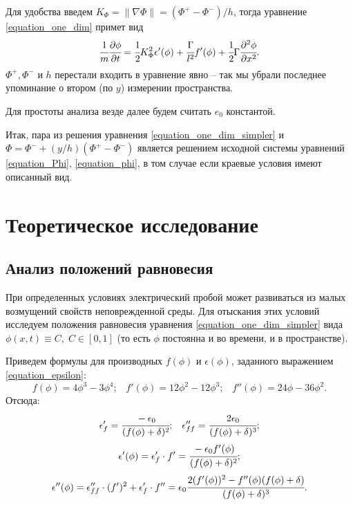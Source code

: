 \documentclass[a4paper,12pt]{article}
\theoremstyle{plain}
\theoremstyle{definition}
\begin{document}
Для удобства введем $K_\Phi = \|\nabla \Phi\| = (\Phi^+ - \Phi^-)/h$, тогда уравнение \eqref{equation_one_dim} примет вид
\begin{equation}
    \cfrac{1}{m} \cfrac{\partial \phi}{\partial t} = \cfrac{1}{2} K_\Phi^2 \epsilon'(\phi) + \cfrac{\Gamma}{l^2} f'(\phi) + \cfrac{1}{2} \Gamma \cfrac{\partial^2 \phi}{\partial x^2} \text{.}
    \label{equation_one_dim_simpler}
\end{equation}
$\Phi^+, \Phi^-$ и $h$ перестали входить в уравнение явно -- так мы убрали последнее упоминание о втором (по $y$) измерении пространства.

Для простоты анализа везде далее будем считать $e_0$ константой.

Итак, пара из решения уравнения \eqref{equation_one_dim_simpler} и $\Phi = \Phi^- + (y/h)(\Phi^+ - \Phi^-)$ является решением исходной системы уравнений \eqref{equation_Phi}, \eqref{equation_phi}, в том случае если краевые условия имеют описанный вид.


\section{Теоретическое исследование}
\label{section_theoretical_analysis}

\subsection{Анализ положений равновесия}

При определенных условиях электрический пробой может развиваться из малых возмущений свойств неповрежденной среды. Для отыскания этих условий исследуем положения равновесия уравнения \eqref{equation_one_dim_simpler} вида $\phi(x, t) \equiv C, \; C \in [0, 1]$ (то есть $\phi$ постоянна и во времени, и в пространстве).

Приведем формулы для производных $f(\phi)$ и $\epsilon(\phi)$, заданного выражением \eqref{equation_epsilon}:
$$f(\phi) = 4 \phi^3 - 3 \phi^4 \text{;} \quad f'(\phi) = 12 \phi^2 - 12 \phi^3 \text{;} \quad f''(\phi) = 24 \phi - 36 \phi^2 \text{.}$$
Отсюда:
$$\epsilon'_f = \cfrac{-\epsilon_0}{(f(\phi) + \delta)^2} \text{;} \quad \epsilon''_{ff} = \cfrac{2 \epsilon_0}{(f(\phi) + \delta)^3} \text{;}$$
\begin{equation}
    \epsilon'(\phi) = \epsilon'_f \cdot f' = \cfrac{-\epsilon_0 f'(\phi)}{(f(\phi) + \delta)^2} \text{;}
    \label{equation_epsilon_phi}
\end{equation}
\begin{equation}
    \epsilon''(\phi) = \epsilon''_{ff} \cdot (f')^2 + \epsilon'_f \cdot f'' = \epsilon_0 \cfrac{2 (f'(\phi))^2 - f''(\phi)(f(\phi) + \delta)}{(f(\phi) + \delta)^3} \text{.}
    \label{equation_epsilon_phi_phi}
\end{equation}
\end{document}
